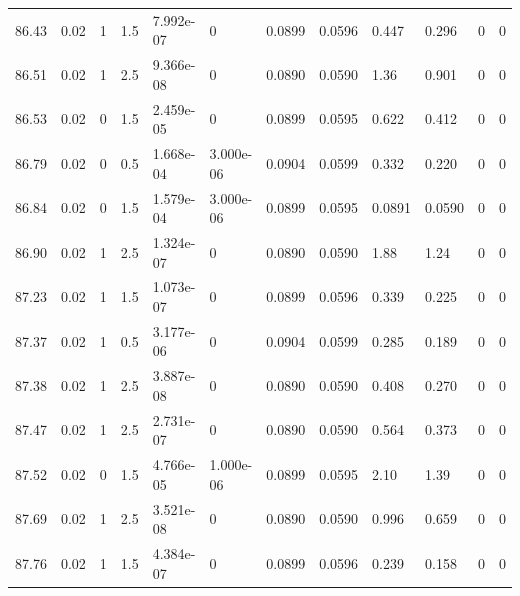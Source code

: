 \documentclass[preview]{standalone}
\begin{document}
{{{{{{{{{{{{{{{{{\begin{tabular}{L{1.2cm}C{1.2cm} C{0.3cm}C{0.5cm} C{1.4cm}C{1.4cm} C{1.4cm}C{1.4cm} C{1.6cm}C{1.6cm} C{1.6cm}C{1.6cm}}
  86.43  &  0.02  & 1     & 1.5 &  7.992e-07  & 0  &  0.0899&   0.0596& 0.447 & 0.296   &  0 & 0  \\ 
  86.51  &  0.02  & 1     & 2.5 &  9.366e-08  & 0  &  0.0890&   0.0590& 1.36 & 0.901   &  0 & 0  \\ 
  86.53  &  0.02  & 0     & 1.5 &  2.459e-05  & 0  &  0.0899&   0.0595& 0.622 & 0.412   &  0 & 0  \\ 
  86.79  &  0.02  & 0     & 0.5 &  1.668e-04  & 3.000e-06  &  0.0904&   0.0599& 0.332 & 0.220   &  0 & 0  \\ 
  86.84  &  0.02  & 0     & 1.5 &  1.579e-04  & 3.000e-06  &  0.0899&   0.0595& 0.0891 & 0.0590   &  0 & 0  \\ 
  86.90  &  0.02  & 1     & 2.5 &  1.324e-07  & 0  &  0.0890&   0.0590& 1.88 & 1.24   &  0 & 0  \\ 
  87.23  &  0.02  & 1     & 1.5 &  1.073e-07  & 0  &  0.0899&   0.0596& 0.339 & 0.225   &  0 & 0  \\ 
  87.37  &  0.02  & 1     & 0.5 &  3.177e-06  & 0  &  0.0904&   0.0599& 0.285 & 0.189   &  0 & 0  \\ 
  87.38  &  0.02  & 1     & 2.5 &  3.887e-08  & 0  &  0.0890&   0.0590& 0.408 & 0.270   &  0 & 0  \\ 
  87.47  &  0.02  & 1     & 2.5 &  2.731e-07  & 0  &  0.0890&   0.0590& 0.564 & 0.373   &  0 & 0  \\ 
  87.52  &  0.02  & 0     & 1.5 &  4.766e-05  & 1.000e-06  &  0.0899&   0.0595& 2.10 & 1.39   &  0 & 0  \\ 
  87.69  &  0.02  & 1     & 2.5 &  3.521e-08  & 0  &  0.0890&   0.0590& 0.996 & 0.659   &  0 & 0  \\ 
  87.76  &  0.02  & 1     & 1.5 &  4.384e-07  & 0  &  0.0899&   0.0596& 0.239 & 0.158   &  0 & 0  \\ 
\hline 
\end{tabular} 

}}}}}}}}}}}}}}}}}
\end{document}
